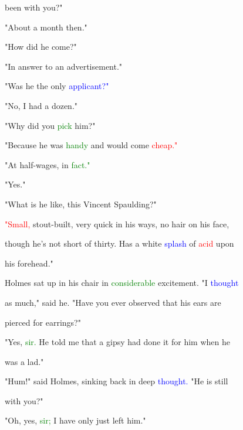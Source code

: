  been with you?"



 "About a month then."



 "How did he come?"



 "In answer to an advertisement."



 "Was he the only \textcolor{blue}{applicant?"}



 "No, I had a dozen."



 "Why did you \textcolor{green}{pick} him?"



 "Because he was \textcolor{green}{handy} and would come \textcolor{red}{cheap."}



 "At half-wages, in \textcolor{green}{fact."}



 "Yes."



 "What is he like, this Vincent Spaulding?"



 \textcolor{red}{"Small,} stout-built, very quick in his ways, no hair on his face,

 though he's not short of thirty. Has a \textcolor{BurntOrange}{white} \textcolor{blue}{splash} of \textcolor{red}{acid} upon

 his forehead."



 Holmes sat up in his chair in \textcolor{green}{considerable} \textcolor{BurntOrange}{excitement.} "I \textcolor{blue}{thought}

 as much," said he. "Have you ever observed that his ears are

 pierced for earrings?"



 "Yes, \textcolor{green}{sir.} He told me that a gipsy had done it for him when he

 was a lad."



 "Hum!" said Holmes, sinking back in deep \textcolor{blue}{thought.} "He is still

 with you?"



 "Oh, yes, \textcolor{green}{sir;} I have only just left him."



